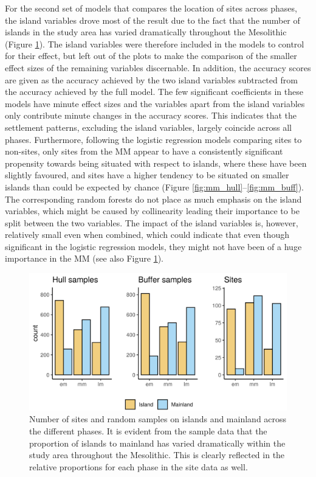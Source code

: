 \documentclass[12pt, a4paper]{article}
\begin{document}
For the second set of models that compares the location of sites across phases, the island variables drove most of the result due to the fact that the number of islands in the study area has varied dramatically throughout the Mesolithic (Figure \ref{fig:island_hist}). The island variables were therefore included in the models to control for their effect, but left out of the plots to make the comparison of the smaller effect sizes of the remaining variables discernable. In addition, the accuracy scores are given as the accuracy achieved by the two island variables subtracted from the accuracy achieved by the full model. The few significant coefficients in these models have minute effect sizes and the variables apart from the island variables only contribute minute changes in the accuracy scores. This indicates that the settlement patterns, excluding the island variables, largely coincide across all phases. Furthermore, following the logistic regression models comparing sites to non-sites, only sites from the MM appear to have a consistently significant propensity towards being situated with respect to islands, where these have been slightly favoured, and sites have a higher tendency to be situated on smaller islands than could be expected by chance (Figure \ref{fig:mm_hull}--\ref{fig:mm_buff}). The corresponding random forests do not place as much emphasis on the island variables, which might be caused by collinearity leading their importance to be split between the two variables. The impact of the island variables is, however, relatively small even when combined, which could indicate that even though significant in the logistic regression models, they might not have been of a huge importance in the MM (see also Figure \ref{fig:island_hist}).

\begin{figure}[ht]
	\centering
	\includegraphics[width = 0.75\linewidth]{island_hist.png}
	\caption{Number of sites and random samples on islands and mainland across the different phases. It is evident from the sample data that the proportion of islands to mainland has varied dramatically within the study area throughout the Mesolithic. This is clearly reflected in the relative proportions for each phase in the site data as well.}
	\label{fig:island_hist}
\end{figure}
\end{document}
